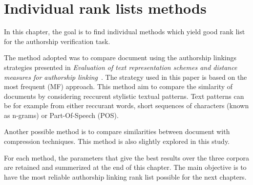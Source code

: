 \section{Individual rank lists methods}

In this chapter, the goal is to find individual methods which yield good rank list for the authorship verification task.

The method adopted was to compare document using the authorship linkings strategies presented in \textit{Evaluation of text representation schemes and distance measures for authorship linking}~\cite{kocher_verification}.
The strategy used in this paper is based on the most frequent (MF) approach.
This method aim to compare the simlarity of documents by considering reccurent stylistic textual patterns.
Text patterns can be for example from either reccurant words, short sequences of characters (known as n-grams) or Part-Of-Speech (POS).

Another possible method is to compare similarities between document with compression techniques.
This method is also slightly explored in this study.

For each method, the parameters that give the best results over the three corpora are retained and summerized at the end of this chapter.
The main objective is to have the most reliable authorship linking rank list possible for the next chapters.







